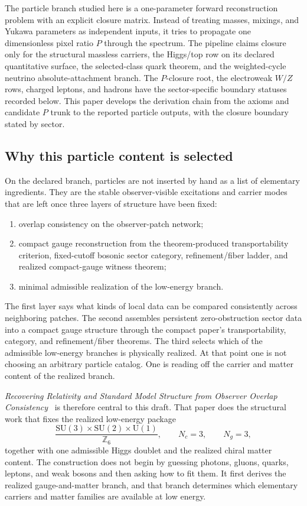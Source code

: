 \documentclass[11pt]{article}
\newcommand{\SU}{\mathrm{SU}}
\newcommand{\U}{\mathrm{U}}
\begin{document}
The particle branch studied here is a one-parameter forward reconstruction problem with an
explicit closure matrix. Instead of treating masses, mixings, and Yukawa parameters as independent
inputs, it tries to propagate one dimensionless pixel ratio \(P\) through the spectrum. The
pipeline claims closure only for the structural massless carriers, the Higgs/top row on its
declared quantitative surface, the selected-class quark theorem, and the weighted-cycle neutrino
absolute-attachment branch. The \(P\)-closure root, the electroweak \(W/Z\) rows, charged leptons,
and hadrons have the sector-specific boundary statuses recorded below. This paper develops the
derivation chain from the axioms and candidate \(P\) trunk to the reported particle outputs, with
the closure boundary stated by sector.

\subsection{Why this particle content is selected}

On the declared branch, particles are not inserted by hand as a list of elementary
ingredients. They are the stable observer-visible excitations and carrier modes that
are left once three layers of structure have been fixed:
\begin{enumerate}[leftmargin=2em]
\item overlap consistency on the observer-patch network;
\item compact gauge reconstruction from the theorem-produced transportability criterion, fixed-cutoff bosonic sector category, refinement/fiber ladder, and realized compact-gauge witness theorem;
\item minimal admissible realization of the low-energy branch.
\end{enumerate}
The first layer says what kinds of local data can be compared consistently across neighboring
patches. The second assembles persistent zero-obstruction sector data into a compact gauge
structure through the compact paper's transportability, category, and refinement/fiber theorems.
The third selects which of the admissible low-energy branches is physically realized.
At that point one is not choosing an arbitrary particle catalog. One is reading off the
carrier and matter content of the realized branch.

\emph{Recovering Relativity and Standard Model Structure from Observer Overlap Consistency}~\cite{ophcompact} is therefore central to this draft. That paper does
the structural work that fixes the realized low-energy package
\[
\frac{\SU(3)\times\SU(2)\times\U(1)}{\mathbb Z_6},
\qquad
N_c=3,
\qquad
N_g=3,
\]
together with one admissible Higgs doublet and the realized chiral matter content. The
construction does not begin by guessing photons, gluons, quarks, leptons, and weak bosons and
then asking how to fit them. It first derives the realized gauge-and-matter branch, and that
branch determines which elementary carriers and matter families are available at low energy.
\end{document}
